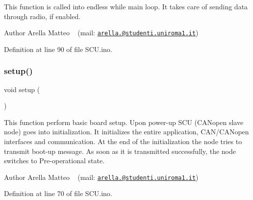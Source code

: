 This function is called into endless while main loop. It takes care of sending data through radio, if enabled. 

\begin{DoxyAuthor}{Author}
Arella Matteo ~\newline
 (mail\+: \href{mailto:arella.1646983@studenti.uniroma1.it}{\tt arella.@studenti.\+uniroma1.\+it}) 
\end{DoxyAuthor}


Definition at line 90 of file S\+C\+U.\+ino.

\mbox{\label{group___main__group__module_ga4fc01d736fe50cf5b977f755b675f11d}} 
\subsubsection{\texorpdfstring{setup()}{setup()}}
{\footnotesize\ttfamily void setup (\begin{DoxyParamCaption}{ }\end{DoxyParamCaption})}



This function perform basic board setup. Upon power-\/up S\+CU (C\+A\+Nopen slave node) goes into initialization. It initializes the entire application, C\+A\+N/\+C\+A\+Nopen interfaces and communication. At the end of the initialization the node tries to transmit boot-\/up message. As soon as it is transmitted successfully, the node switches to Pre-\/operational state. 

\begin{DoxyAuthor}{Author}
Arella Matteo ~\newline
 (mail\+: \href{mailto:arella.1646983@studenti.uniroma1.it}{\tt arella.@studenti.\+uniroma1.\+it}) 
\end{DoxyAuthor}


Definition at line 70 of file S\+C\+U.\+ino.

